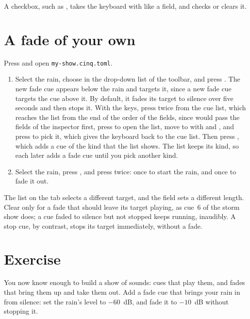 A checkbox, such as , takes the keyboard with
 like a field, and  checks or clears it.

\section{A fade of your own}

Press  and open \texttt{my-show.cinq.toml}.

\begin{enumerate}
\item Select the rain, choose  in the  drop-down list of
  the toolbar, and press .  The new fade cue appears below the
  rain and targets it, since a new fade cue targets the cue above it.  By
  default, it fades its target to silence over five seconds and then stops
  it.  With the keys, press  twice from the cue list, which
  reaches the  list from the end of the order of the fields,
  since  would pass the fields of the inspector first, press
   to open the list, move to  with  and ,
  and press  to pick it, which gives the keyboard back to the cue
  list.  Then press , which adds a cue of the kind that the list shows.
  The list keeps its kind, so each later  adds a fade cue until you
  pick another kind.
\item Select the rain, press , and press  twice:
  once to start the rain, and once to fade it out.
\end{enumerate}

The  list on the  tab selects a different target, and
the  field sets a different length.  Clear  only for a fade that should leave its target playing, as cue~6 of the
storm show does; a cue faded to silence but not stopped keeps running,
inaudibly.  A stop cue, by contrast, stops its target immediately, without a
fade.

\section*{Exercise}

You now know enough to build a show of sounds: cues that play them, and fades
that bring them up and take them out.  Add a fade cue that brings your rain
in from silence: set the rain's level to $-60$~dB, and fade it to $-10$~dB
without stopping it.
